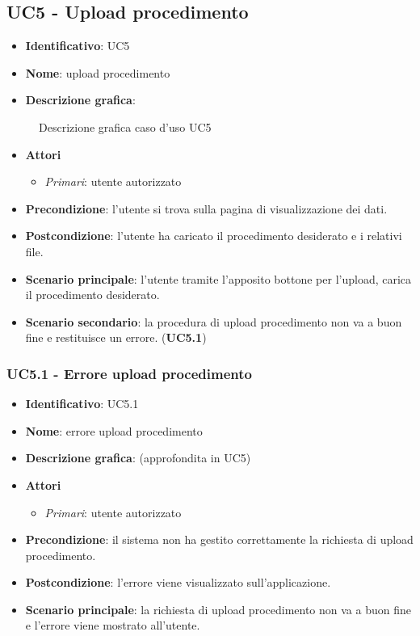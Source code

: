 \subsection{UC5 - Upload procedimento}
\begin{itemize}
  \item \textbf{Identificativo}: UC5
  \item \textbf{Nome}: upload procedimento
  \item \textbf{Descrizione grafica}:
\end{itemize}

\begin{figure}[h]
  \centering
  \caption{Descrizione grafica caso d'uso UC5}
\end{figure}

\begin{itemize}
  \item \textbf{Attori}
        \begin{itemize}
          \item \textit{Primari}: utente autorizzato
        \end{itemize}
  \item \textbf{Precondizione}: l'utente si trova sulla pagina di visualizzazione dei dati.
  \item \textbf{Postcondizione}: l'utente ha caricato il procedimento desiderato e i relativi file.
  \item \textbf{Scenario principale}: l'utente tramite l'apposito bottone per l'upload, carica il procedimento desiderato.
  \item \textbf{Scenario secondario}: la procedura di upload procedimento non va a buon fine e restituisce un errore. (\textbf{UC5.1})
\end{itemize}

\subsubsection{UC5.1 - Errore upload procedimento}
\begin{itemize}
  \item \textbf{Identificativo}: UC5.1
  \item \textbf{Nome}: errore upload procedimento
  \item \textbf{Descrizione grafica}: (approfondita in UC5)
  \item \textbf{Attori}
        \begin{itemize}
          \item \textit{Primari}: utente autorizzato
        \end{itemize}
  \item \textbf{Precondizione}: il sistema non ha gestito correttamente la richiesta di upload procedimento.
  \item \textbf{Postcondizione}: l'errore viene visualizzato sull'applicazione.
  \item \textbf{Scenario principale}: la richiesta di upload procedimento non va a buon fine e l'errore viene mostrato all'utente.
\end{itemize}
